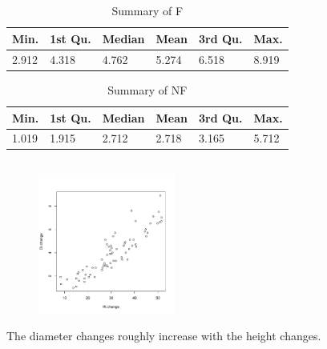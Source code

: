 \documentclass[twocolumn]{article}
\begin{document}
\subsection{}
\begin{table}[h]
\begin{tabular}{@{}llllll@{}}
\toprule
Min.  & 1st Qu. & Median & Mean  & 3rd Qu. & Max.  \\ \midrule
2.912 & 4.318   & 4.762  & 5.274 & 6.518   & 8.919 \\ \bottomrule
\end{tabular}
\caption{Summary of F}
\end{table}
\begin{table}[h]
\begin{tabular}{llllll}
\toprule
Min.  & 1st Qu. & Median & Mean  & 3rd Qu. & Max.  \\ \midrule
1.019 & 1.915   & 2.712  & 2.718 & 3.165   & 5.712 \\ \bottomrule
\end{tabular}
\caption{Summary of NF}
\end{table}

\newpage

\subsection{}
\begin{figure}[h]
\centering
\includegraphics[width=0.4\textwidth]{6e.pdf}
\end{figure}
The diameter changes roughly increase with the height changes.
\end{document}
